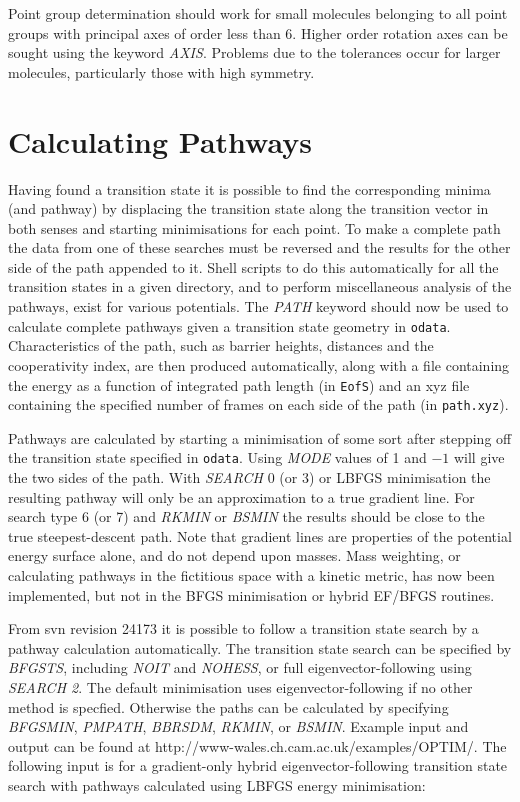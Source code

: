 \documentclass[12pt,a4paper,dvips]{article}
\begin{document}
Point group determination should work for small molecules belonging to all point groups with 
principal axes of order less than 6. Higher order rotation axes can be sought using the
keyword {\it AXIS\/}. Problems due to the tolerances occur for larger molecules,
particularly those with high symmetry. 

\section{Calculating Pathways}
\label{sec:pathways}
Having found a transition state it is possible to
find the corresponding minima (and pathway) by displacing the transition state along
the transition vector in both senses and starting minimisations for each point. To make
a complete path the data from one of these searches must be reversed and the results
for the other side of the path appended to it. Shell scripts to do this automatically
for all the transition states in a given directory, and to perform miscellaneous analysis
of the pathways, exist for various potentials. The {\it PATH\/} keyword should now be
used to calculate complete pathways given a transition state geometry in {\tt odata}.
Characteristics of the path, such as barrier heights, distances and the cooperativity index,
are then produced automatically, along with a file containing the energy as a function
of integrated path length (in {\tt EofS}) and an xyz file containing the specified number
of frames on each side of the path (in {\tt path.xyz}).

Pathways are calculated by starting a minimisation of some sort after stepping off the
transition state specified in {\tt odata}.
Using {\it MODE\/} values of 1 and $-1$ will give the two sides of the path.
With {\it SEARCH\/} 0 (or 3) or LBFGS minimisation 
the resulting pathway will only be an approximation to a true
gradient line. For search type 6 (or 7) and {\it RKMIN\/} or {\it BSMIN\/} 
the results should be close to the true steepest-descent
path. Note that gradient lines are properties of the potential energy surface alone, and
do not depend upon masses. Mass weighting, or calculating pathways in the fictitious
space with a kinetic metric,\cite{banerjeea92} has now been implemented, but not in the BFGS
minimisation or hybrid EF/BFGS routines.

From svn revision 24173 it is possible to follow a transition state search by a
pathway calculation automatically. The transition state search can be specified
by {\it BFGSTS\/}, including {\it NOIT\/} and {\it NOHESS}, or full eigenvector-following
using {\it SEARCH 2\/}.
The default minimisation uses eigenvector-following if no other method is specfied.
Otherwise the paths can be calculated by specifying {\it BFGSMIN\/},
{\it PMPATH\/}, {\it BBRSDM\/}, {\it RKMIN\/}, or {\it BSMIN\/}.
Example input and output can be found at http://www-wales.ch.cam.ac.uk/examples/OPTIM/.
The following input is for a gradient-only hybrid eigenvector-following transition state
search with pathways calculated using LBFGS energy minimisation:
\end{document}
